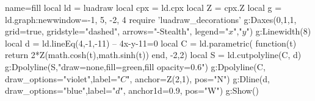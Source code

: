 \documentclass{standalone}%
\begin{document}
\begin{luadraw}{name=fill}
local ld = luadraw
local cpx = ld.cpx
local Z = cpx.Z
local g = ld.graph:new{window={-1, 5, -2, 4}}  
require 'luadraw_decorations'
g:Daxes({0,1,1}, {grid=true, gridstyle="dashed", arrows="-Stealth", legend={"$x$","$y$"}})
g:Linewidth(8)
local d = ld.lineEq(4,-1,-11) -- 4x-y-11=0
local C = ld.parametric( function(t) return 2*Z(math.cosh(t),math.sinh(t)) end, -2,2)
local S = ld.cutpolyline(C, d)
g:Dpolyline(S,"draw=none,fill=green,fill opacity=0.6")
g:Dpolyline(C, {draw_options="violet",label="$C$", anchor=Z(2,1), pos="N"})
g:Dline(d, {draw_options="blue",label="$d$", anchor1d=0.9, pos="W"})
g:Show()
\end{luadraw}
\end{document}
